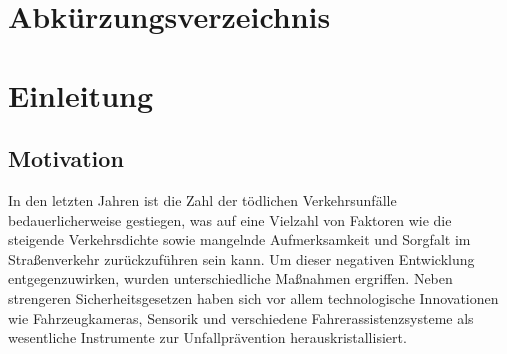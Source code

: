 \documentclass[a4paper, 12pt]{article} %
\begin{document}
\clearpage

\section*{Abkürzungsverzeichnis}
\begin{acronym}

\end{acronym}

   

   

   

   







\clearpage


\tableofcontents

\clearpage

\setcounter{page}{1}

\section{Einleitung}

\subsection{Motivation}
In den letzten Jahren ist die Zahl der tödlichen Verkehrsunfälle bedauerlicherweise gestiegen, was auf eine Vielzahl von Faktoren wie die 
steigende Verkehrsdichte sowie mangelnde Aufmerksamkeit und Sorgfalt im Straßenverkehr zurückzuführen sein kann. 
Um dieser negativen Entwicklung entgegenzuwirken, wurden unterschiedliche Maßnahmen ergriffen. 
Neben strengeren Sicherheitsgesetzen haben sich vor allem technologische Innovationen wie Fahrzeugkameras, 
Sensorik und verschiedene Fahrerassistenzsysteme als wesentliche Instrumente zur Unfallprävention herauskristallisiert.
\end{document}
